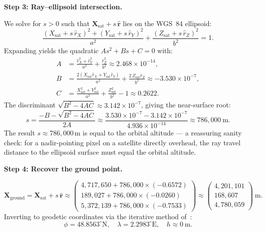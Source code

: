 \documentclass{book}
\begin{document}
\medskip
\noindent\textbf{Step 3: Ray--ellipsoid intersection.}

We solve for $s > 0$ such that
$\mathbf{X}_{\text{sat}} + s\,\hat{\mathbf{r}}$ lies on the WGS~84
ellipsoid:
\[
  \frac{(X_{\text{sat}} + s\,\hat{r}_X)^2
      + (Y_{\text{sat}} + s\,\hat{r}_Y)^2}{a^2}
  + \frac{(Z_{\text{sat}} + s\,\hat{r}_Z)^2}{b^2}
  = 1.
\]
Expanding yields the quadratic $As^2 + Bs + C = 0$ with:
\begin{align*}
  A &= \frac{\hat{r}_X^2 + \hat{r}_Y^2}{a^2}
       + \frac{\hat{r}_Z^2}{b^2}
     \approx 2.468 \times 10^{-14}, \\[4pt]
  B &= \frac{2(X_{\text{sat}}\hat{r}_X
              + Y_{\text{sat}}\hat{r}_Y)}{a^2}
       + \frac{2\,Z_{\text{sat}}\hat{r}_Z}{b^2}
     \approx -3.530 \times 10^{-7}, \\[4pt]
  C &= \frac{X_{\text{sat}}^2 + Y_{\text{sat}}^2}{a^2}
       + \frac{Z_{\text{sat}}^2}{b^2} - 1
     \approx 0.2622.
\end{align*}
The discriminant $\sqrt{B^2 - 4AC} \approx 3.142 \times 10^{-7}$,
giving the near-surface root:
\[
  s = \frac{-B - \sqrt{B^2 - 4AC}}{2A}
    \approx \frac{3.530 \times 10^{-7} - 3.142 \times 10^{-7}}
                 {4.936 \times 10^{-14}}
    \approx 786{,}000\ \text{m}.
\]
The result $s \approx 786{,}000$\,m is equal to the orbital altitude ---
a reassuring sanity check: for a nadir-pointing pixel on a satellite
directly overhead, the ray travel distance to the ellipsoid surface
must equal the orbital altitude.

\medskip
\noindent\textbf{Step 4: Recover the ground point.}

\[
  \mathbf{X}_{\text{ground}}
  = \mathbf{X}_{\text{sat}} + s\,\hat{\mathbf{r}}
  \approx
  \begin{pmatrix}
    4{,}717{,}650 + 786{,}000 \times (-0.6572) \\
    189{,}027     + 786{,}000 \times (-0.0260)  \\
    5{,}372{,}139 + 786{,}000 \times (-0.7533)
  \end{pmatrix}
  \approx
  \begin{pmatrix}
    4{,}201{,}101 \\ 168{,}607 \\ 4{,}780{,}059
  \end{pmatrix}\ \text{m}.
\]
Inverting to geodetic coordinates via the iterative
method of~\cite{bowring1985geodetic}:
\[
  \phi   = 48.8563^\circ\text{N},\quad
  \lambda = 2.2983^\circ\text{E},\quad
  h       \approx 0\ \text{m}.
\]
\end{document}
